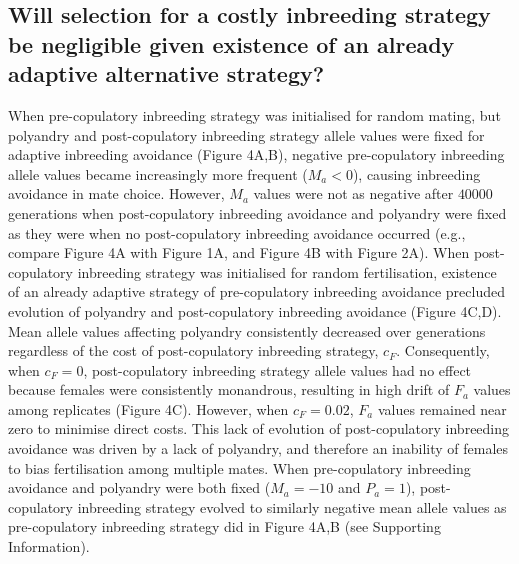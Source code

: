 \documentclass[10pt,letterpaper]{article}
\begin{document}
\subsection*{Will selection for a costly inbreeding strategy be negligible given existence of an already adaptive alternative strategy?}

When pre-copulatory inbreeding strategy was initialised for random mating, but polyandry and post-copulatory inbreeding strategy allele values were fixed for adaptive inbreeding avoidance (Figure 4A,B), negative pre-copulatory inbreeding allele values became increasingly more frequent ($M_{a}<0$), causing inbreeding avoidance in mate choice. However, $M_{a}$ values were not as negative after $40000$ generations when post-copulatory inbreeding avoidance and polyandry were fixed as they were when no post-copulatory inbreeding avoidance occurred (e.g., compare Figure 4A with Figure 1A, and Figure 4B with Figure 2A). When post-copulatory inbreeding strategy was initialised for random fertilisation, existence of an already adaptive strategy of pre-copulatory inbreeding avoidance precluded evolution of polyandry and post-copulatory inbreeding avoidance (Figure 4C,D). Mean allele values affecting polyandry consistently decreased over generations regardless of the cost of post-copulatory inbreeding strategy, $c_{F}$. Consequently, when $c_{F}=0$, post-copulatory inbreeding strategy allele values had no effect because females were consistently monandrous, resulting in high drift of $F_{a}$ values among replicates (Figure 4C). However, when $c_{F}=0.02$, $F_{a}$ values remained near zero to minimise direct costs. This lack of evolution of post-copulatory inbreeding avoidance was driven by a lack of polyandry, and therefore an inability of females to bias fertilisation among multiple mates. When pre-copulatory inbreeding avoidance and polyandry were both fixed ($M_{a}=-10$ and $P_{a}=1$), post-copulatory inbreeding strategy evolved to similarly negative mean allele values as pre-copulatory inbreeding strategy did in Figure 4A,B (see Supporting Information). 
\end{document}
